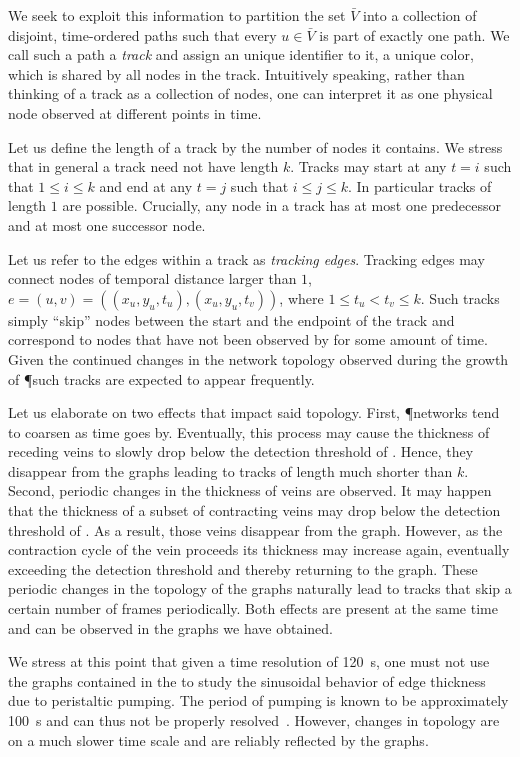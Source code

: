 		We seek to exploit this information to partition the set $\bar{V}$ into a collection of disjoint, time-ordered paths such that every $u \in \bar{V}$ is part of exactly one path. We call such a path a \emph{track} and assign an unique identifier to it, \eg a unique color, which is shared by all nodes in the track. Intuitively speaking, rather than thinking of a track as a collection of nodes, one can interpret it as one physical node observed at different points in time.

		Let us define the length of a track by the number of nodes it contains. We stress that in general a track need not have length $k$. Tracks may start at any $t=i$ such that $1 \le i \le k$ and end at any $t=j$ such that $i \le j \le k$. In particular tracks of length $1$ are possible. Crucially, any node in a track has at most one predecessor and at most one successor node.

		Let us refer to the edges within a track as \emph{tracking edges}. Tracking edges may connect nodes of temporal distance larger than $1$, \ie $e = (u,v) = ((x_u,y_u,t_u), (x_u,y_u,t_v))$, where $1 \le t_u < t_v \le k$. Such tracks simply ``skip'' nodes between the start and the endpoint of the track and correspond to nodes that have not been observed by \NEFI for some amount of time. Given the continued changes in the network topology observed during the growth of \P such tracks are expected to appear frequently. 

		Let us elaborate on two effects that impact said topology. First, \P networks tend to coarsen as time goes by. Eventually, this process may cause the thickness of receding veins to slowly drop below the detection threshold of \NEFI. Hence, they disappear from the graphs leading to tracks of length much shorter than $k$. Second, periodic changes in the thickness of veins are observed. It may happen that the thickness of a subset of contracting veins may drop below the detection threshold of \NEFI. As a result, those veins disappear from the graph. However, as the contraction cycle of the vein proceeds its thickness may increase again, eventually exceeding the detection threshold and thereby returning to the graph. These periodic changes in the topology of the graphs naturally lead to tracks that skip a certain number of frames periodically. Both effects are present at the same time and can be observed in the graphs we have obtained.

		We stress at this point that given a time resolution of \SI{120}{\second}, one must not use the graphs contained in the \data to study the sinusoidal behavior of edge thickness due to peristaltic pumping. The period of pumping is known to be approximately \SI{100}{\second} and can thus not be properly resolved~\cite{stewart1959protoplasmic}. However, changes in topology are on a much slower time scale and are reliably reflected by the graphs.

